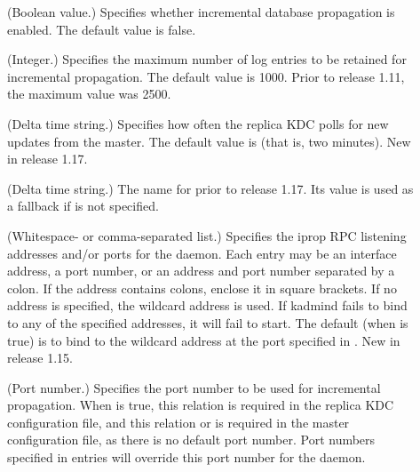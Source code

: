 \documentclass[letterpaper,10pt,english]{sphinxmanual}
\begin{document}
\begin{description}
\item[{}] \leavevmode
(Boolean value.)  Specifies whether incremental database
propagation is enabled.  The default value is false.

\item[{}] \leavevmode
(Integer.)  Specifies the maximum number of log entries to be
retained for incremental propagation.  The default value is 1000.
Prior to release 1.11, the maximum value was 2500.

\item[{}] \leavevmode
(Delta time string.)  Specifies how often the replica KDC polls
for new updates from the master.  The default value is 
(that is, two minutes).  New in release 1.17.

\item[{}] \leavevmode
(Delta time string.)  The name for  prior to
release 1.17.  Its value is used as a fallback if
 is not specified.

\item[{}] \leavevmode
(Whitespace- or comma-separated list.)  Specifies the iprop RPC
listening addresses and/or ports for the {\hyperref[\detokenize{admin/admin_commands/kadmind:kadmind-8}]{}} daemon.
Each entry may be an interface address, a port number, or an
address and port number separated by a colon.  If the address
contains colons, enclose it in square brackets.  If no address is
specified, the wildcard address is used.  If kadmind fails to bind
to any of the specified addresses, it will fail to start.  The
default (when  is true) is to bind to the wildcard
address at the port specified in .  New in release
1.15.

\item[{}] \leavevmode
(Port number.)  Specifies the port number to be used for
incremental propagation.  When  is true, this
relation is required in the replica KDC configuration file, and
this relation or  is required in the master
configuration file, as there is no default port number.  Port
numbers specified in  entries will override this
port number for the {\hyperref[\detokenize{admin/admin_commands/kadmind:kadmind-8}]{}} daemon.


\end{description}
\end{document}
